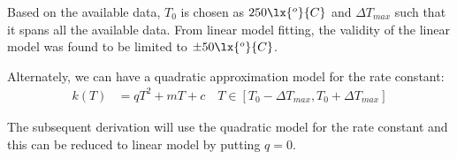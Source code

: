 Based on the available data, $T_0$ is chosen as $250 \lx{^o}{C}$ and $\Delta
T_{max}$ such that it spans all the available data. From linear model fitting,
the validity of the linear model was found to be limited to $\pm 50 \lx{^o}{C}$.

Alternately, we can have a quadratic approximation model for the rate constant:
\begin{align}
    k(T) &= q T^2 + m T + c \quad T \in [T_0 - \Delta T_{max}, T_0 + \Delta T_{max}]
\end{align}

The subsequent derivation will use the quadratic model for the rate constant and
this can be reduced to linear model by putting $q = 0$.
